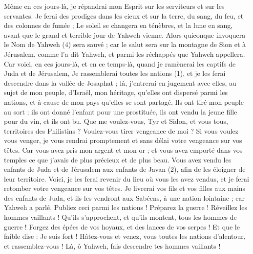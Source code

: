 \begin{multicols}{2}
Même en ces jours-là, je répandrai mon Esprit sur les serviteurs et sur les servantes.
Je ferai des prodiges dans les cieux et sur la terre, du sang, du feu, et des colonnes de fumée ;
Le soleil se changera en ténèbres, et la lune en sang, avant que le grand et terrible jour de Yahweh vienne.
Alors quiconque invoquera le Nom de Yahweh (4) sera sauvé ; car le salut sera sur la montagne de Sion et à Jérusalem, comme l’a dit Yahweh, et parmi les réchappés que Yahweh appellera.
\VerseOne{}Car voici, en ces jours-là, et en ce temps-là, quand je ramènerai les captifs de Juda et de Jérusalem,
Je rassemblerai toutes les nations (1), et je les ferai descendre dans la vallée de Josaphat ; là, j'entrerai en jugement avec elles, au sujet de mon peuple, d'Israël, mon héritage, qu’elles ont dispersé parmi les nations, et à cause de mon pays qu'elles se sont partagé.
Ils ont tiré mon peuple au sort ; ils ont donné l’enfant pour une prostituée, ils ont vendu la jeune fille pour du vin, et ils ont bu.
Que me voulez-vous, Tyr et Sidon, et vous tous, territoires des Philistins ? Voulez-vous tirer vengeance de moi ? Si vous voulez vous venger, je vous rendrai promptement et sans délai votre vengeance sur vos têtes.
Car vous avez pris mon argent et mon or ; et vous avez emporté dans vos temples ce que j’avais de plus précieux et de plus beau.
Vous avez vendu les enfants de Juda et de Jérusalem aux enfants de Javan (2), afin de les éloigner de leur territoire.
Voici, je les ferai revenir du lieu où vous les avez vendus, et je ferai retomber votre vengeance sur vos têtes.
Je livrerai vos fils et vos filles aux mains des enfants de Juda, et ils les vendront aux Sabéens, à une nation lointaine ; car Yahweh a parlé.
Publiez ceci parmi les nations ! Préparez la guerre ! Réveillez les hommes vaillants ! Qu’ils s’approchent, et qu’ils montent, tous les hommes de guerre !
Forgez des épées de vos hoyaux, et des lances de vos serpes ! Et que le faible dise : Je suis fort !
Hâtez-vous et venez, vous toutes les nations d'alentour, et rassemblez-vous ! Là, ô Yahweh, fais descendre tes hommes vaillants !

\end{multicols}
